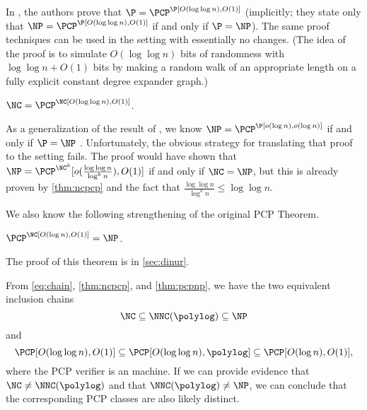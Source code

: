 \documentclass{article}
\newcommand{\loglog}{\log \log}
\begin{document}
In \cite{fs96}, the authors prove that $\P = \PCP^\P[O(\loglog n), O(1)]$ (implicitly; they state only that $\NP = \PCP^\P[O(\loglog n), O(1)]$ if and only if $\P = \NP$).
The same proof techniques can be used in the \NC{} setting with essentially no changes.
(The idea of the proof is to simulate $O(\loglog n)$ bits of randomness with $\loglog n + O(1)$ bits by making a random walk of an appropriate length on a fully explicit constant degree expander graph.)

\begin{theorem}\label{thm:ncpcp}
  $\NC = \PCP^\NC[O(\loglog n), O(1)]$.
\end{theorem}

As a generalization of the result of \cite{fs96}, we know $\NP = \PCP^\P[o(\log n), o(\log n)]$ if and only if $\P = \NP$ \cite{as98, fglss91}.
Unfortunately, the obvious strategy for translating that proof to the \NC{} setting fails.
The proof would have shown that $\NP = \PCP^{\NC^k}[o(\frac{\loglog n}{\log^k n}), O(1)]$ if and only if $\NC = \NP$, but this is already proven by \autoref{thm:ncpcp} and the fact that $\frac{\loglog n}{\log^k n} \leq \loglog n$.

We also know the following strengthening of the original PCP Theorem.
\begin{theorem}\label{thm:pcpnp}
  $\PCP^\NC[O(\log n), O(1)] = \NP$.
\end{theorem}
The proof of this theorem is in \autoref{sec:dinur}.

From \autoref{eq:chain}, \autoref{thm:ncpcp}, and \autoref{thm:pcpnp}, we have the two equivalent inclusion chains
\begin{equation*}
  \NC \subseteq \NNC(\polylog) \subseteq \NP
\end{equation*}
and
\begin{equation*}
  \PCP[O(\loglog n), O(1)] \subseteq \PCP[O(\loglog n), \polylog] \subseteq \PCP[O(\log n), O(1)],
\end{equation*}
where the PCP verifier is an \NC{} machine.
If we can provide evidence that $\NC \neq \NNC(\polylog)$ and that $\NNC(\polylog) \neq \NP$, we can conclude that the corresponding PCP classes are also likely distinct.
\end{document}
